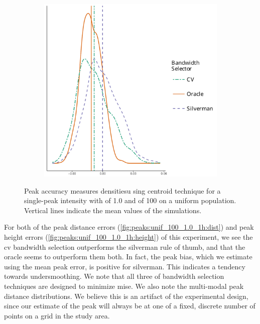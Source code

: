 \begin{figure}[htbp]
\begin{subfigure}[b]{0.45\textwidth}
        \includegraphics[width=\textwidth]{output/centroid-height-histogram}
    \end{subfigure}
    \caption[Centroid accuracy: Single-peak of 100 on uniform population]{Peak accuracy measures densitiesu sing centroid technique for a single-peak intensity with  of 1.0 and  of 100 on a uniform population. Vertical lines indicate the mean values of the simulations.}
    \label{fig:centroids:unif_100_1.0_1h}
\end{figure}

For both of the peak distance errors (\cref{fig:peaks:unif_100_1.0_1h:dist}) and peak height errors (\cref{fig:peaks:unif_100_1.0_1h:height}) of this experiment,
we see the \gls{cv} bandwidth selection outperforms the \gls{silverman} rule of thumb, and that the \gls{oracle} seems to outperform them both.
In fact, the \gls{peak bias}, which we estimate using the mean \gls{peak error},
is positive for \gls{silverman}.
This indicates a tendency towards undersmoothing.
We note that all three of bandwidth selection techniques are designed to minimize \gls{mise}.
We also note the multi-modal peak distance distributions.
We believe this is an artifact of the experimental design,
since our estimate of the peak will always be at one of a fixed, discrete number of points on a grid in the study area.

